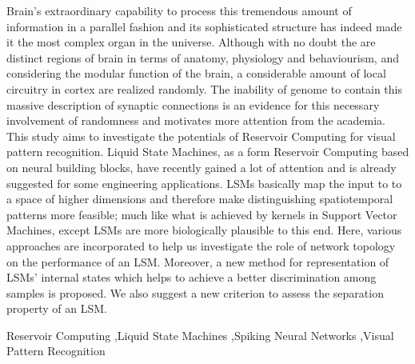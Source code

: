 \begin{abstract_en}
Brain's extraordinary capability to process this tremendous amount of information in a parallel fashion and its sophisticated structure has indeed made it the most complex organ in the universe. Although with no doubt the are distinct regions of brain in terms of anatomy, physiology and behaviourism, and considering the modular function of the brain, a considerable amount of local circuitry in cortex are realized randomly. The inability of genome to contain this massive description of synaptic connections is an evidence for this necessary involvement of randomness and motivates more attention from the academia. This study aims to investigate the potentials of Reservoir Computing for visual pattern recognition. Liquid State Machines, as a form Reservoir Computing based on neural building blocks, have recently gained a lot of attention and is already suggested for some engineering applications. LSMs basically map the input to to a space of higher dimensions and therefore make distinguishing spatiotemporal patterns more feasible; much like what is achieved by kernels in Support Vector Machines, except LSMs are more biologically plausible to this end. Here, various approaches are incorporated to help us investigate the role of network topology on the performance of an LSM. Moreover, a new method for representation of LSMs' internal states which helps to achieve a better discrimination among samples is proposed. We also suggest a new criterion to assess the separation property of an LSM.
\end{abstract_en}
\begin{keyword_en}
Reservoir Computing \sep Liquid State Machines \sep Spiking Neural Networks \sep Visual Pattern Recognition
\end{keyword_en}